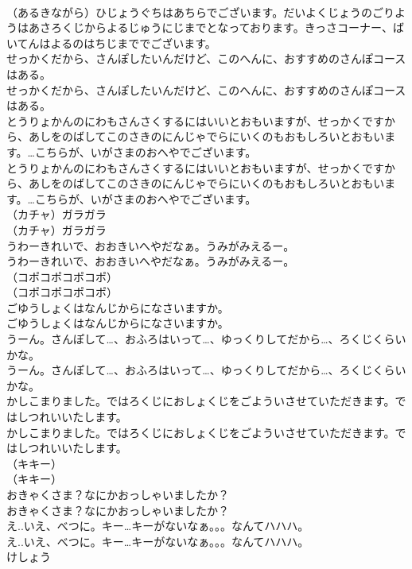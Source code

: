 \documentclass[8pt]{extreport}
\begin{document}
\begin{CJK}{UTF8}{min}
\\	（あるきながら）ひじょうぐちはあちらでございます。だいよくじょうのごりようはあさろくじからよるじゅうにじまでとなっております。きっさコーナー、ばいてんはよるのはちじまででございます。 
\\	せっかくだから、さんぽしたいんだけど、このへんに、おすすめのさんぽコースはある。	
\\	せっかくだから、さんぽしたいんだけど、このへんに、おすすめのさんぽコースはある。 
\\	とうりょかんのにわもさんさくするにはいいとおもいますが、せっかくですから、あしをのばしてこのさきのにんじゃでらにいくのもおもしろいとおもいます。…こちらが、いがさまのおへやでございます。	
\\	とうりょかんのにわもさんさくするにはいいとおもいますが、せっかくですから、あしをのばしてこのさきのにんじゃでらにいくのもおもしろいとおもいます。…こちらが、いがさまのおへやでございます。 
\\	（カチャ）ガラガラ	
\\	（カチャ）ガラガラ 
\\	うわーきれいで、おおきいへやだなぁ。うみがみえるー。	
\\	うわーきれいで、おおきいへやだなぁ。うみがみえるー。 
\\	（コポコポコポコポ）	
\\	（コポコポコポコポ） 
\\	ごゆうしょくはなんじからになさいますか。	
\\	ごゆうしょくはなんじからになさいますか。 
\\	うーん。さんぽして…、おふろはいって…、ゆっくりしてだから…、ろくじくらいかな。	
\\	うーん。さんぽして…、おふろはいって…、ゆっくりしてだから…、ろくじくらいかな。 
\\	かしこまりました。ではろくじにおしょくじをごよういさせていただきます。ではしつれいいたします。	
\\	かしこまりました。ではろくじにおしょくじをごよういさせていただきます。ではしつれいいたします。 
\\	（キキー）	
\\	（キキー） 
\\	おきゃくさま？なにかおっしゃいましたか？	
\\	おきゃくさま？なにかおっしゃいましたか？ 
\\	え..いえ、べつに。キー…キーがないなぁ。。。なんてハハハ。	
\\	え..いえ、べつに。キー…キーがないなぁ。。。なんてハハハ。 
\\	けしょう

\end{CJK}
\end{document}
